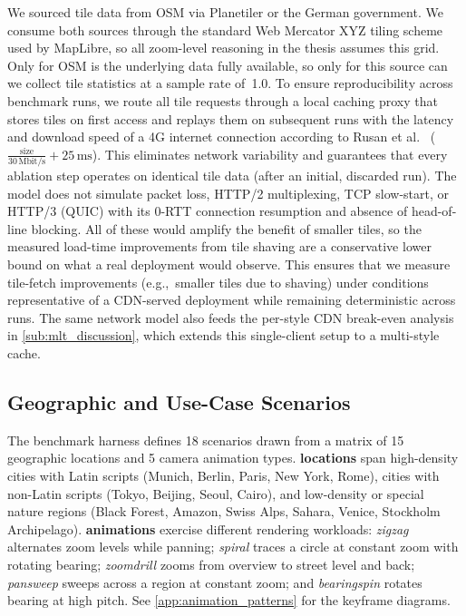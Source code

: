 We sourced tile data from \ac{OSM} via Planetiler or the German government.
We consume both sources through the standard Web Mercator XYZ tiling scheme used by MapLibre, so all zoom-level reasoning in the thesis assumes this grid.
Only for \ac{OSM} is the underlying data fully available, so only for this source can we collect tile statistics at a sample rate of~1.0.
To ensure reproducibility across benchmark runs, we route all tile requests through a local caching proxy that stores tiles on first access and replays them on subsequent runs with the latency and download speed of a 4G internet connection according to Rusan et al.~\cite{rusanAssessmentPacketLatency2015} ($\frac{\text{size}}{30\,\mathrm{Mbit/s}} + 25\,\mathrm{ms}$).
This eliminates network variability and guarantees that every ablation step operates on identical tile data (after an initial, discarded run).
The model does not simulate packet loss, HTTP/2 multiplexing, TCP slow-start, or HTTP/3 (QUIC) with its 0-RTT connection resumption and absence of head-of-line blocking.
All of these would amplify the benefit of smaller tiles, so the measured load-time improvements from tile shaving are a conservative lower bound on what a real deployment would observe.
This ensures that we measure tile-fetch improvements (e.g.,\ smaller tiles due to shaving) under conditions representative of a \ac{CDN}-served deployment while remaining deterministic across runs.
The same network model also feeds the per-style \ac{CDN} break-even analysis in \cref{sub:mlt_discussion}, which extends this single-client setup to a multi-style cache.

\subsection{Geographic and Use-Case Scenarios}\label{sub:scenarios}

The benchmark harness defines 18 scenarios drawn from a matrix of 15 geographic locations and 5 camera animation types.
\textbf{locations} span high-density cities with Latin scripts (Munich, Berlin, Paris, New York, Rome), cities with non-Latin scripts (Tokyo, Beijing, Seoul, Cairo), and low-density or special nature regions (Black Forest, Amazon, Swiss Alps, Sahara, Venice, Stockholm Archipelago).
\textbf{animations} exercise different rendering workloads:
\emph{zigzag} alternates zoom levels while panning;
\emph{spiral} traces a circle at constant zoom with rotating bearing;
\emph{zoomdrill} zooms from overview to street level and back;
\emph{pansweep} sweeps across a region at constant zoom;
and \emph{bearingspin} rotates bearing at high pitch.
See \cref{app:animation_patterns} for the keyframe diagrams.

